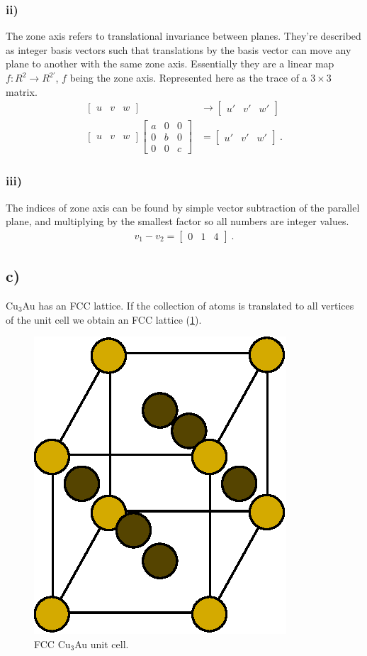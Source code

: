 \documentclass[a4paper]{article}
\begin{document}
	\subsubsection{ii)}
	The zone axis refers to translational invariance between planes. They're described as integer basis vectors such that translations by the basis vector can move any plane to another with the same zone axis. Essentially they are a linear map $f: R^{2} \to R^{2'}$, $f$ being the zone axis. Represented here as the trace of a $3\times3$ matrix.
	\begin{align}
		\begin{bmatrix}
		u & v & w
		\end{bmatrix} &\to 
		\begin{bmatrix}
		u' & v' & w'
		\end{bmatrix}\\
		\begin{bmatrix}
		u & v & w
		\end{bmatrix}
		\begin{bmatrix}
		a & 0 & 0\\
		0 & b & 0 \\
		0 & 0 & c
		\end{bmatrix}
		&=
		\begin{bmatrix}
		u' & v' & w'
		\end{bmatrix}~.
	\end{align}
	\subsubsection{iii)}
	The indices of zone axis can be found by simple vector subtraction of the parallel plane, and multiplying by the smallest factor so all numbers are integer values.
	\begin{align}
		v_{1} - v_{2} = 
		\begin{bmatrix}
		0 & 1 & 4
		\end{bmatrix}~.
	\end{align}
	
	\subsection{c)}
	Cu$_{3}$Au has an FCC lattice. If the collection of atoms is translated to all vertices of the unit cell we obtain an FCC lattice (\cref{f:fcc}).
	\begin{figure}
		\centering
		\includegraphics[width=0.33\linewidth]{cu3au.eps}
		\caption{FCC Cu$_{3}$Au unit cell.}
		\label{f:fcc}
	\end{figure}
\end{document}
